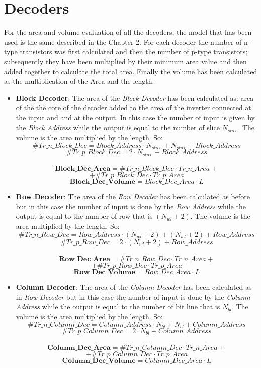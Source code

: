\section{Decoders}
For the area and volume evaluation of all the decoders, the model that has been used is the same described in the Chapter 2. For each decoder the number of n-type transistors was first calculated and then the number of p-type transistors; subsequently they have been multiplied by their minimum area value and then added together to calculate the total area. Finally the volume has been calculated as the multiplication of the Area and the length.

\begin{itemize}
\item{\textbf{Block Decoder}}:
The area of the \textit{Block Decoder} has been calculated as: area of the the core of the decoder added to the area of the inverter connected at the input and and at the output. In this case the number of input is given by the \textit{Block Address} while the output is equal to the number of slice $N_{slice}$. The volume is the area multiplied by the length. So:
	\[
	\#Tr\_n\_Block\_Dec = Block\_Address \cdot N_{slice} + N_{slice} + Block\_Address
	\]
	\[
	\#Tr\_p\_Block\_Dec = 2 \cdot N_{slice} + Block\_Address
	\]
	\\
	\[
	\textbf{Block\_Dec\_Area} = \#Tr\_n\_Block\_Dec \cdot Tr\_n\_Area +
	\]
	\[
	+ \#Tr\_p\_Block\_Dec \cdot Tr\_p\_Area
	\]
	\[
	\textbf{Block\_Dec\_Volume} = Block\_Dec\_Area \cdot L
	\]

\item{\textbf{Row Decoder}}:
The area of the \textit{Row Decoder} has been calculated as before but in this case the number of input is done by the \textit{Row Address} while the output is equal to the number of row that is $(N_{wl}+2)$. The volume is the area multiplied by the length. So:
	\[
	\#Tr\_n\_Row\_Dec = Row\_Address \cdot (N_{wl}+2) + (N_{wl}+2) + Row\_Address
	\]
	\[
	\#Tr\_p\_Row\_Dec = 2 \cdot (N_{wl}+2) + Row\_Address
	\]
	\\
	\[
	\textbf{Row\_Dec\_Area} = \#Tr\_n\_Row\_Dec \cdot Tr\_n\_Area +
	\]
	\[
	+ \#Tr\_p\_Row\_Dec \cdot Tr\_p\_Area
	\]
	\[
	\textbf{Row\_Dec\_Volume} = Row\_Dec\_Area \cdot L
	\]
\newpage
\item{\textbf{Column Decoder}}:
The area of the \textit{Column Decoder} has been calculated as in \textit{Row Decoder} but in this case the number of input is done by the \textit{Column Address} while the output is equal to the number of bit line that is $N_{bl}$. The volume is the area multiplied by the length. So:
	\[
	\#Tr\_n\_Column\_Dec = Column\_Address \cdot N_{bl} + N_{bl} + Column\_Address
	\]
	\[
	\#Tr\_p\_Column\_Dec = 2 \cdot N_{bl} + Column\_Address
	\]
	\\
	\[
	\textbf{Column\_Dec\_Area} = \#Tr\_n\_Column\_Dec \cdot Tr\_n\_Area + 
	\]
	\[
	+ \#Tr\_p\_Column\_Dec \cdot Tr\_p\_Area
	\]
	\[
	\textbf{Column\_Dec\_Volume} = Column\_Dec\_Area \cdot L
	\]


\end{itemize}
